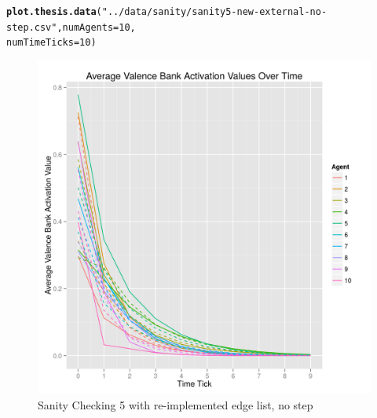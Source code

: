 \documentclass{article}\usepackage[]{graphicx}\usepackage[]{color}
\makeatletter
\def\maxwidth{ %
  \ifdim\Gin@nat@width>\linewidth
    \linewidth
  \else
    \Gin@nat@width
  \fi
}
\newcommand{\hlnum}[1]{\textcolor[rgb]{0.686,0.059,0.569}{#1}}%
\newcommand{\hlstr}[1]{\textcolor[rgb]{0.192,0.494,0.8}{#1}}%
\newcommand{\hlstd}[1]{\textcolor[rgb]{0.345,0.345,0.345}{#1}}%
\newcommand{\hlkwc}[1]{\textcolor[rgb]{0.333,0.667,0.333}{#1}}%
\newcommand{\hlkwd}[1]{\textcolor[rgb]{0.737,0.353,0.396}{\textbf{#1}}}%
\newenvironment{kframe}{%
 \def\at@end@of@kframe{}%
 \ifinner\ifhmode%
  \def\at@end@of@kframe{\end{minipage}}%
  \begin{minipage}{\columnwidth}%
 \fi\fi%
 \def\FrameCommand##1{\hskip\@totalleftmargin \hskip-\fboxsep
 \colorbox{shadecolor}{##1}\hskip-\fboxsep
     \hskip-\linewidth \hskip-\@totalleftmargin \hskip\columnwidth}%
 \MakeFramed {\advance\hsize-\width
   \@totalleftmargin\z@ \linewidth\hsize
   \@setminipage}}%
 {\par\unskip\endMakeFramed%
 \at@end@of@kframe}
\newenvironment{knitrout}{}{} %
\makeatother
\begin{document}
\newpage
\begin{knitrout}
\color{fgcolor}\begin{kframe}
\begin{alltt}
\hlkwd{plot.thesis.data}\hlstd{(}\hlstr{"../data/sanity/sanity5-new-external-no-step.csv"}\hlstd{,} \hlkwc{numAgents} \hlstd{=} \hlnum{10}\hlstd{,}
    \hlkwc{numTimeTicks} \hlstd{=} \hlnum{10}\hlstd{)}
\end{alltt}
\end{kframe}\begin{figure}[]

\includegraphics[width=\maxwidth]{figure/plot-sanity-5-v2-nostep} \caption[Sanity Checking 5 with re-implemented edge list, no step]{Sanity Checking 5 with re-implemented edge list, no step\label{fig:plot-sanity-5-v2-nostep}}
\end{figure}


\end{knitrout}


\newpage
\end{document}
